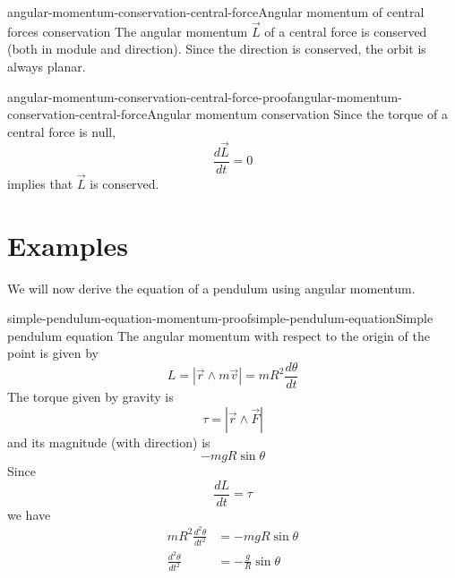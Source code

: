 \documentclass[preview]{standalone}
\begin{document}
\begin{snippetcorollary}{angular-momentum-conservation-central-force}{Angular momentum of central forces conservation}
    The angular momentum \(\vec{L}\) of a central force is conserved (both in module and direction).
    Since the direction is conserved, the orbit is always planar.
\end{snippetcorollary}

\begin{snippetproof}{angular-momentum-conservation-central-force-proof}{angular-momentum-conservation-central-force}{Angular momentum conservation}
    Since the torque of a central force is null,
    \[
        \frac{d\vec{L}}{dt} = 0
    \]
    implies that \(\vec{L}\) is conserved.
\end{snippetproof}

\section{Examples}

\begin{plainhtml}
    We will now derive the equation of a pendulum using angular momentum.
\end{plainhtml}

\begin{snippetproof}{simple-pendulum-equation-momentum-proof}{simple-pendulum-equation}{Simple pendulum equation}
    The angular momentum with respect to the origin of the point is given by
    \[
        L = |\vec{r} \wedge m\vec{v}| = mR^2 \frac{d\theta}{dt}
    \]
    The torque given by gravity is
    \[
        \tau = |\vec{r} \wedge \vec{F}|
    \]
    and its magnitude (with direction) is
    \[
        -mgR\sin\theta
    \]
    Since
    \[
        \frac{dL}{dt} = \tau
    \]
    we have
    \begin{align*}
        mR^2 \frac{d^2\theta}{dt^2} &= -mgR\sin\theta \\
        \frac{d^2\theta}{dt^2} &= -\frac{g}{R} \sin\theta
    \end{align*}
\end{snippetproof}
\end{document}

